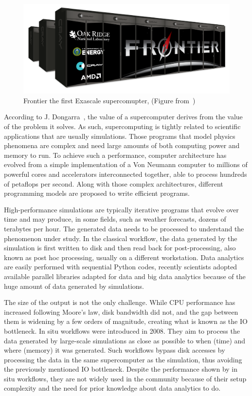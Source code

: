 \begin{figure}
\includegraphics[width=0.9\linewidth]{figures/Frontier.original.png}
\caption{Frontier the first Exascale supercomupter, (Figure from~\cite{frontier-image})}
\label{figfrontier}
\end{figure}

According to J. Dongarra~\cite{dongarra_trends_2006}, the value of a supercomputer derives from the value of the problem it solves. As such, supercomputing is tightly related to scientific applications that are usually simulations. Those programs that model physics phenomena are complex and need large amounts of both computing power and memory to run. 
To achieve such a performance, computer architecture has evolved from a simple implementation of a Von Neumann computer to millions of powerful cores and accelerators interconnected together, able to process hundreds of petaflops per second. Along with those complex architectures, different programming models are proposed to write efficient programs.   

High-performance simulations are typically iterative programs that evolve over time and may produce, in some fields, such as weather forecasts, dozens of terabytes per hour.   
The generated data needs to be processed to understand the phenomenon under study. 
In the classical workflow, the data generated by the simulation is first written to disk and then read back for post-processing, also known as post hoc processing, usually on a different workstation. 
Data analytics are easily performed with sequential Python codes, recently scientists adopted available parallel libraries adapted for data and big data analytics because of the huge amount of data generated by simulations. 

The size of the output is not the only challenge. While CPU performance has increased following Moore's law, disk bandwidth did not, and the gap between them is widening by a few orders of magnitude, creating what is known as the IO bottleneck. 
In situ workflows were introduced in 2008. They aim to process the data generated by large-scale simulations as close as possible to when (time) and where (memory) it was generated. Such workflows bypass disk accesses by processing the data in the same supercomputer as the simulation, thus avoiding the previously mentioned IO bottleneck. 
Despite the performance shown by in situ workflows, they are not widely used in the community because of their setup complexity and the need for prior knowledge about data analytics to do.  


